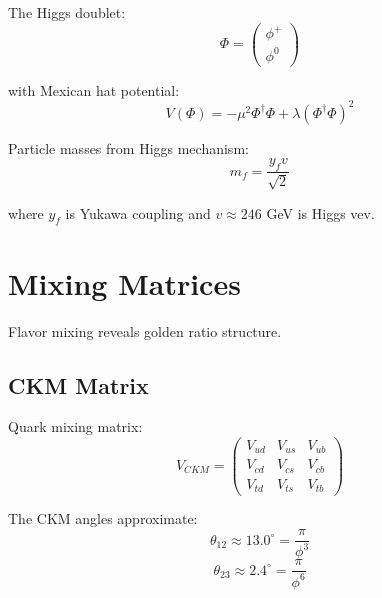 \begin{definition}
\label{def:higgs}
The Higgs doublet:
\begin{equation}
\Phi = \begin{pmatrix}\phi^+ \\ \phi^0\end{pmatrix}
\end{equation}

with Mexican hat potential:
\begin{equation}
V(\Phi) = -\mu^2\Phi^\dagger\Phi + \lambda(\Phi^\dagger\Phi)^2
\end{equation}
\end{definition}

\begin{proposition}
\label{prop:higgs-mass}
Particle masses from Higgs mechanism:
\begin{equation}
m_f = \frac{y_f v}{\sqrt{2}}
\end{equation}

where $y_f$ is Yukawa coupling and $v \approx 246$ GeV is Higgs vev.
\end{proposition}

\section{Mixing Matrices}

Flavor mixing reveals golden ratio structure.

\subsection{CKM Matrix}

\begin{definition}
\label{def:ckm}
Quark mixing matrix:
\begin{equation}
V_{CKM} = \begin{pmatrix}
V_{ud} & V_{us} & V_{ub} \\
V_{cd} & V_{cs} & V_{cb} \\
V_{td} & V_{ts} & V_{tb}
\end{pmatrix}
\end{equation}
\end{definition}

\begin{proposition}
\label{prop:ckm-golden}
The CKM angles approximate:
\begin{equation}
\theta_{12} \approx 13.0^\circ = \frac{\pi}{\phi^3}
\end{equation}
\begin{equation}
\theta_{23} \approx 2.4^\circ = \frac{\pi}{\phi^6}
\end{equation}
\end{proposition}

